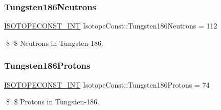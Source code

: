 \subsubsection{\texorpdfstring{Tungsten186\+Neutrons}{Tungsten186Neutrons}}
{\footnotesize\ttfamily \mbox{\hyperlink{group___isotope_const-_macros_ga5f18360b3e99483a35c32d789e62621c}{I\+S\+O\+T\+O\+P\+E\+C\+O\+N\+S\+T\+\_\+\+I\+NT}} Isotope\+Const\+::\+Tungsten186\+Neutrons = 112}

\$ \$ Neutrons in Tungsten-\/186. \mbox{\label{group___isotope_const-_tungsten-_w186_ga74c69270ad7ad81ba5e071458cfba08d}} 
\subsubsection{\texorpdfstring{Tungsten186\+Protons}{Tungsten186Protons}}
{\footnotesize\ttfamily \mbox{\hyperlink{group___isotope_const-_macros_ga5f18360b3e99483a35c32d789e62621c}{I\+S\+O\+T\+O\+P\+E\+C\+O\+N\+S\+T\+\_\+\+I\+NT}} Isotope\+Const\+::\+Tungsten186\+Protons = 74}

\$ \$ Protons in Tungsten-\/186. 